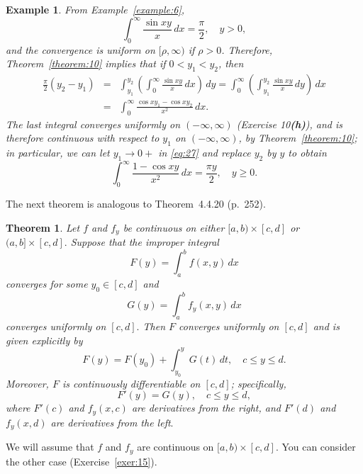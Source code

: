 \documentclass{article}
\newtheorem{theorem}{Theorem}
\newtheorem{example}{Example}
\newcommand{\proof}{\noindent{\sc\bf Proof}\quad }
\begin{document}
\begin{example}  \label{example:11}  \rm
From Example~\ref{example:6},
$$
\int_{0}^{\infty}\frac{\sin xy}{x}\,dx=\frac{\pi}{2}, \quad y>0,
$$
and the convergence is uniform on $[\rho,\infty)$ if $\rho>0$. Therefore,
Theorem~\ref{theorem:10}  implies that if $0<y_{1}<y_{2}$, then
\begin{eqnarray}
\frac{\pi}{2}(y_{2}-y_{1})
&=&\int_{y_{1}}^{y_{2}}\left(\int_{0}^{\infty}\frac{\sin
xy}{x}\,dx\right)\,dy
=\int_{0}^{\infty}\left(\int_{y_{1}}^{y_{2}}\frac{\sin
xy}{x}\,dy\right)\,dx
\nonumber\\
&=&\int_{0}^{\infty}\frac{\cos xy_{1}-\cos xy_{2}}{x^{2}} \,dx.
\label{eq:27}
\end{eqnarray}
The last integral converges uniformly on $(-\infty,\infty)$
(Exercise 10{\bf(h)}), and is therefore continuous with respect to
$y_{1}$ on $(-\infty,\infty)$, by
Theorem~\ref{theorem:10}; in particular,
we can let $y_{1}\to0+$ in  \eqref{eq:27} and replace $y_{2}$
by  $y$ to obtain
$$
\int_{0}^{\infty} \frac{1-\cos xy}{x^{2}}\,dx=\frac{\pi y}{2}, \quad y
\ge 0.
 $$
\end{example}


The next theorem is analogous to  Theorem~4.4.20 (p.~252).


\begin{theorem}  \label{theorem:11}
Let   $f$  and $f_{y}$   be  continuous on either
$[a,b)\times [c,d]$ or $(a,b]\times [c,d].$ Suppose    that
the improper integral
$$
F(y)=\int_{a}^{b}f(x,y)\,dx
$$
converges for some $y_{0} \in [c,d]$ and
$$
G(y)=\int_{a}^{b}f_{y}(x,y)\,dx
$$
converges uniformly on $[c,d].$ Then $F$  converges
uniformly on $[c,d]$ and is given explicitly by
$$
F(y)=F(y_{0})+\int_{y_{0}}^{y} G(t)\,dt,\quad c\le y\le d.
$$
Moreover, $F$  is continuously differentiable on $[c,d]$; specifically,
\begin{equation} \label{eq:28}
F'(y)=G(y), \quad c \le y \le d,
\end{equation}
where  $F'(c)$ and $f_{y}(x,c)$ are derivatives
from the right, and $F'(d)$ and $f_{y}(x,d)$ are
 derivatives from the left$.$
\end{theorem}

\proof We will  assume that $f$ and $f_{y}$ are continuous
on $[a,b)\times [c,d]$. You can consider the other case
(Exercise~\ref{exer:15}).
\end{document}
